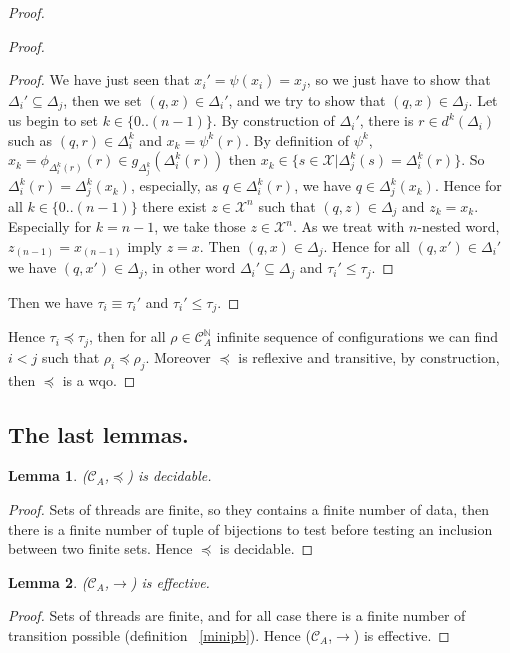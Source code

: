 \documentclass[a4paper,10pt]{report}
\newtheorem{lm}{Lemma}
\theoremstyle{remark}
\newcommand{\seg}[1]{\{#1\}}
\newcommand{\ts}{\seg{0 .. (n-1)}}
\newcommand{\C}{\mathcal{C}_{A}}
\newcommand{\Xa}{\mathcal{X}}
\newcommand{\X}{\mathcal{X}^{n}}
\begin{document}
\begin {proof}
\begin{proof}
\begin{proof}
  We have just seen that $ x_i'=\psi(x_i)=x_j$, so we just have to show that $\Delta_i' \subseteq \Delta_j$,
  then we set $(q,x) \in \Delta_i'$, and we try to show that $(q,x) \in \Delta_j$. 
  Let us begin to set $k \in \ts$. 
  By construction of $\Delta_i'$, there is $r \in d^k(\Delta_i)$ such as $(q,r) \in \Delta^k_i$ and $x_k = \psi^k(r)$.
  By definition of $\psi^k$, $x_k=\phi_{\Delta_i^k(r)}(r) \in g_{\Delta^k_j}(\Delta^k_i(r))$ 
  then $ x_k \in \{ s \in \Xa | \Delta^k_j(s)= \Delta^k_i(r) \}$.
  So $\Delta^k_i(r)=\Delta^k_j(x_k)$, especially, as $q \in \Delta^k_i(r)$, we have  $q \in \Delta^k_j(x_k)$.
  Hence for all $k \in \ts$ there exist $z \in \X$ such that $(q,z) \in \Delta_j$ and $z_k = x_k$.
  Especially for $k = n-1$, we take those $z \in \X$.
  As we treat with $n$-nested word, $z_{(n-1)} = x_{(n-1)}$ imply $z = x$. 
  Then $(q,x) \in \Delta_j$.
  Hence for all $(q,x') \in \Delta_i'$ we have $(q,x') \in \Delta_j$, in other word $\Delta_i' \subseteq \Delta_j$ and $\tau_i' \leq \tau_j$.
\end{proof}
Then we have $\tau_i \equiv \tau_i'$ and  $\tau_i' \leq \tau_j$.
\end{proof}	
Hence $\tau_i \preceq \tau_j$, then for all $\rho \in \C^{\mathbb N}$ infinite sequence of configurations we can find $i < j$ such that $\rho_i \preceq \rho_j$.
Moreover $\preceq$ is reflexive and transitive, by construction, then $\preceq$ is a wqo.

\end{proof}


\subsection{The last lemmas.}
\begin{lm} \label{cd2}
  ($\C$,$\preceq$) is decidable.
\end{lm}
\begin{proof}
  Sets of threads are finite, so they contains a finite number of data, then there is a finite number of tuple of bijections to test before testing an inclusion between two finite sets.
  Hence $\preceq$ is decidable.
\end{proof}

\begin{lm} \label{cd3}
  ($\C$,$\rightarrow$) is effective.
\end{lm}

\begin{proof}
   Sets of threads are finite, and for all case there is a finite number of transition possible (definition ~\ref{minipb}).
   Hence ($\C$,$\rightarrow$) is effective.
\end{proof}
\end{document}
